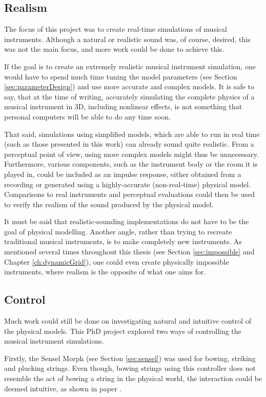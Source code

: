 \subsection{Realism}\label{sec:realism}
The focus of this project was to create real-time simulations of musical instruments. Although a natural or realistic sound was, of course, desired, this was not the main focus, and more work could be done to achieve this.

If the goal is to create an extremely realistic musical instrument simulation, one would have to spend much time tuning the model parameters (see Section \ref{sec:parameterDesign}) and use more accurate and complex models. It is safe to say, that at the time of writing, accurately simulating the complete physics of a musical instrument in 3D, including nonlinear effects, is not something that personal computers will be able to do any time soon. 

That said, simulations using simplified models, which are able to run in real time (such as those presented in this work) can already sound quite realistic. From a perceptual point of view, using more complex models might thus be unnecessary. Furthermore, various components, such as the instrument body or the room it is played in, could be included as an impulse response, either obtained from a recording or generated using a highly-accurate (non-real-time) physical model. Comparisons to real instruments and perceptual evaluations could then be used to verify the realism of the sound produced by the physical model.

It must be said that realistic-sounding implementations do not have to be the goal of physical modelling. Another angle, rather than trying to recreate traditional musical instruments, is to make completely new instruments. As mentioned several times throughout this thesis (see Section \ref{sec:impossible} and Chapter \ref{ch:dynamicGrid}), one could even create physically impossible instruments, where realism is the opposite of what one aims for.

\subsection{Control}
Much work could still be done on investigating natural and intuitive control of the physical models. This PhD project explored two ways of controlling the musical instrument simulations. 

Firstly, the Sensel Morph (see Section \ref{sec:sensel}) was used for bowing, striking and plucking strings. Even though, bowing strings using this controller does not resemble the act of bowing a string in the physical world, the interaction could be deemed intuitive, as shown in paper \citeP[A].

